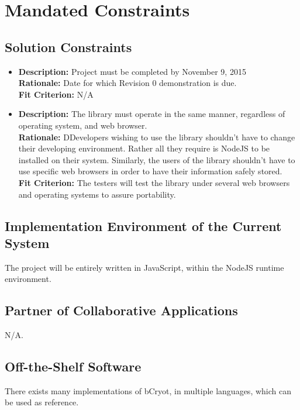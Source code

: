 \documentclass[12pt]{article}
\begin{document}
\section*{}
\section{Mandated Constraints}
\subsection{Solution Constraints}
\begin{itemize} 

  \item \textbf{Description:} Project must be completed by November 9, 2015 \\
    \textbf{Rationale:} Date for which Revision 0 demonstration is due. \\
    \textbf{Fit Criterion:} N/A 

  
  \item \textbf{Description:} The library must operate in the same manner, regardless of operating system, and web   browser. \\
    \textbf{Rationale:} DDevelopers wishing to use the library shouldn’t have to change their developing environment. Rather all they require is NodeJS to be installed on their system. Similarly, the users of the library shouldn’t have to use specific web browsers in order to have their information safely stored.\\
    \textbf{Fit Criterion:} The testers will test the library under several web browsers and operating systems to assure portability.\\
\end{itemize}


\subsection{Implementation Environment of the Current System}
  The project will be entirely written in JavaScript, within the NodeJS runtime environment.

\subsection{Partner of Collaborative Applications}
  N/A.

\subsection{Off-the-Shelf Software}
  There exists many implementations of bCryot, in multiple languages, which can be used as reference.
\end{document}
